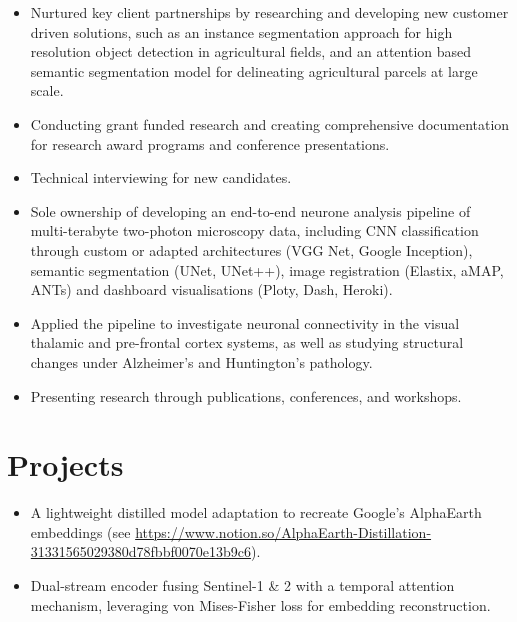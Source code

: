 \documentclass[9pt]{extarticle} %
\begin{document}
\begin{itemize}
    \itemsep -0.4em
    \item Nurtured key client partnerships by researching and developing new customer driven solutions, such as an instance segmentation approach for high resolution object detection in agricultural fields, and an attention based semantic segmentation model for delineating agricultural parcels at large scale.
    \item Conducting grant funded research and creating comprehensive documentation for research award programs and conference presentations.
    \item Technical interviewing for new candidates.
\end{itemize}

\begin{itemize}
    \itemsep -0.4em
    \item Sole ownership of developing an end-to-end neurone analysis pipeline of multi-terabyte two-photon microscopy data, including CNN classification through custom or adapted architectures (VGG Net, Google Inception), semantic segmentation (UNet, UNet++), image registration (Elastix, aMAP, ANTs) and dashboard visualisations (Ploty, Dash, Heroki).
    \item Applied the pipeline to investigate neuronal connectivity in the visual thalamic and pre-frontal cortex systems, as well as studying structural changes under Alzheimer's and Huntington's pathology.
    \item Presenting research through publications, conferences, and workshops.
\end{itemize}




\section{Projects}

\begin{itemize}
    \itemsep -0.4em
    \item A lightweight distilled model adaptation to recreate Google's AlphaEarth embeddings (see \href{report}{https://www.notion.so/AlphaEarth-Distillation-31331565029380d78fbbf0070e13b9c6}).
    \item Dual-stream encoder fusing Sentinel-1 & 2 with a temporal attention mechanism, leveraging von Mises-Fisher loss for embedding reconstruction. 
\end{itemize}
\end{document}
